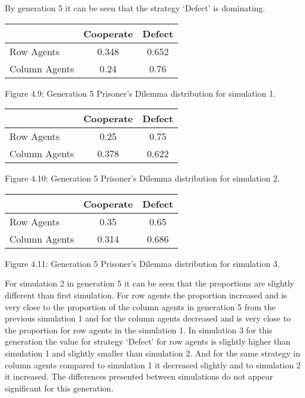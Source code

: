 \documentclass{article}
\begin{document}
By generation 5 it can be seen that the strategy `Defect' is dominating.
\begin{center}
\begin{tabular}{|l|c|c|}
\hline
& Cooperate & Defect \\ 
\hline
Row Agents & 0.348 & 0.652\\
\hline
Column Agents & 0.24 & 0.76\\
\hline
\end{tabular}
\end{center}
\begin{center}
Figure 4.9: Generation 5 Prisoner’s Dilemma distribution for simulation 1.
\end{center}

\begin{center}
\begin{tabular}{|l|c|c|}
\hline
& Cooperate & Defect \\ 
\hline
Row Agents & 0.25 & 0.75\\
\hline
Column Agents & 0.378 & 0.622\\
\hline
\end{tabular}
\end{center}
\begin{center}
Figure 4.10: Generation 5 Prisoner’s Dilemma distribution for simulation 2.
\end{center}

\begin{center}
\begin{tabular}{|l|c|c|}
\hline
& Cooperate & Defect \\ 
\hline
Row Agents & 0.35 & 0.65\\
\hline
Column Agents & 0.314 & 0.686\\
\hline
\end{tabular}
\end{center}
\begin{center}
Figure 4.11: Generation 5 Prisoner’s Dilemma distribution for simulation 3.
\end{center}

For simulation 2 in generation 5 it can be seen that the proportions are slightly different than first simulation. For row agents the proportion increased and is very close to the proportion of the column agents in generation 5 from the previous simulation 1 and for the column agents decreased and is very close to the proportion for row agents in the simulation 1.
In simulation 3 for this generation the value for strategy `Defect' for row agents is slightly higher than simulation 1 and slightly smaller than simulation 2. And for the same strategy in column agents compared to simulation 1 it decreased slightly and to simulation 2 it increased. The differences presented between simulations do not appear significant for this generation.
\end{document}
